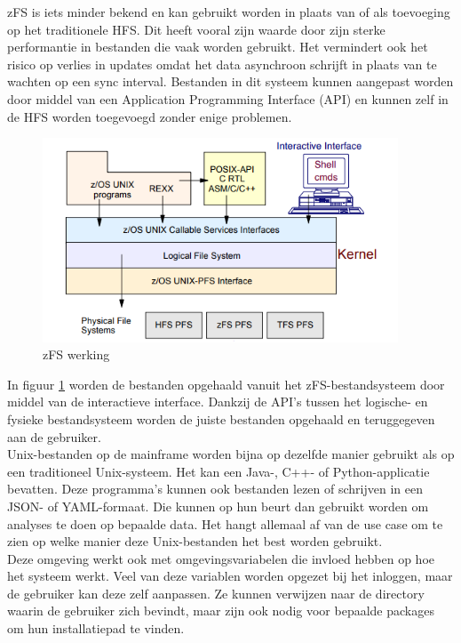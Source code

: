 zFS is iets minder bekend en kan gebruikt worden in plaats van of als toevoeging op het traditionele HFS. Dit heeft vooral zijn waarde door zijn sterke performantie in bestanden die vaak worden gebruikt. Het vermindert ook het risico op verlies in updates omdat het data asynchroon schrijft in plaats van te wachten op een sync interval. Bestanden in dit systeem kunnen aangepast worden door middel van een Application Programming Interface (API) en kunnen zelf in de HFS worden toegevoegd zonder enige problemen. \autocite{IBM2012} \\

\begin{figure}[pt!]
    \centering
    \includegraphics[width=300pt]{./graphics/zFS.png}
    \caption{zFS werking \autocite{IBM2012}}
    \label{fig:zFS}
\end{figure}

In figuur \ref{fig:zFS} worden de bestanden opgehaald vanuit het zFS-bestandsysteem door middel van de interactieve interface. Dankzij de API's tussen het logische- en fysieke bestandsysteem worden de juiste bestanden opgehaald en teruggegeven aan de gebruiker. \autocite{IBM2012} \\

Unix-bestanden op de mainframe worden bijna op dezelfde manier gebruikt als op een traditioneel Unix-systeem. Het kan een Java-, C++- of Python-applicatie bevatten. Deze programma's kunnen ook bestanden lezen of schrijven in een JSON- of YAML-formaat. Die kunnen op hun beurt dan gebruikt worden om analyses te doen op bepaalde data. Het hangt allemaal af van de use case om te zien op welke manier deze Unix-bestanden het best worden gebruikt. \autocite{Precisely2020} \\

Deze omgeving werkt ook met omgevingsvariabelen die invloed hebben op hoe het systeem werkt. Veel van deze variablen worden opgezet bij het inloggen, maar de gebruiker kan deze zelf aanpassen. Ze kunnen verwijzen naar de directory waarin de gebruiker zich bevindt, maar zijn ook nodig voor bepaalde packages om hun installatiepad te vinden. \autocite{HenryStocker2017}

